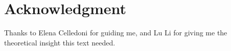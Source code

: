 \section*{Acknowledgment}
Thanks to Elena Celledoni for guiding me, and Lu Li for giving me the theoretical insight this text needed.%

